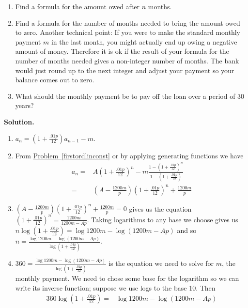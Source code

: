 \documentclass[10pt,]{book}
\theoremstyle{plain}
\theoremstyle{definition}
\theoremstyle{definition}
\numberwithin{equation}{chapter}
\newcommand{\amp}{&}
\begin{document}
\begin{exerciselist}
\begin{enumerate}[label=(\alph*)]
\item\hypertarget{li-81}{}Find a formula for the amount owed after \(n\) months.%
\item\hypertarget{li-82}{}Find a formula for the number of months needed to bring the amount owed to zero.  Another technical point: If you were to make the standard monthly payment \(m\) in the last month, you might actually end up owing a negative amount of money.  Therefore it is ok if the result of your formula for the number of months needed gives a non-integer number of months.  The bank would just round up to the next integer and adjust your payment so your balance comes out to zero.%
\item\hypertarget{li-83}{}What should the monthly payment be to pay off the loan over a period of 30 years?%
\end{enumerate}
%
\par\smallskip
\par\smallskip
\noindent\textbf{Solution.}\hypertarget{solution-359}{}\quad
\leavevmode%
\begin{enumerate}[label=(\alph*)]
\item\hypertarget{li-84}{}\(a_n=(1+\frac{.01p}{12})a_{n-1}-m\).%
\item\hypertarget{li-85}{}From \hyperref[firstordlinconst]{Problem~\ref{firstordlinconst}} or by applying generating functions we have%
\begin{align*}
a_n  =\amp  A(1+\frac{.01p}{12})^n-m\frac{1-(1+\frac{.01p}{12})^n}{1-(1+\frac{.01p}{12})}\\
=\amp  \left(A-\frac{1200m}{p}\right)\left(1+\frac{.01p}{12}\right)^n+\frac{1200m}{p}
\end{align*}
%
\item\hypertarget{li-86}{}\(\left(A-\frac{1200m}{p}\right)\left(1+\frac{.01p}{12}\right)^n+\frac{1200m}{p}=0\) gives us the equation \(\left(1+\frac{.01p}{12}\right)^n=\frac{1200m}{1200m-Ap}\). Taking logarithms to any base we choose gives us \(n\log (1+\frac{.01p}{12})=\log 1200m-\log (1200m-Ap)\) and so \(n=\frac{\log 1200m-\log (1200m-Ap)}{\log (1+\frac{.01p}{12})}\).%
\item\hypertarget{li-87}{}\(360=\frac{\log 1200m-\log (1200m-Ap)}{\log (1+\frac{.01p}{12})}\) is the equation we need to solve for \(m\), the monthly payment. We need to chose some base for the logarithm so we can write its inverse function; suppose we use logs to the base 10. Then%
\begin{align*}
360\log (1+\frac{.01p}{12})  =\amp  \log
1200m-\log (1200m-Ap)\\

\end{align*}
\end{enumerate}
\end{exerciselist}
\end{document}
